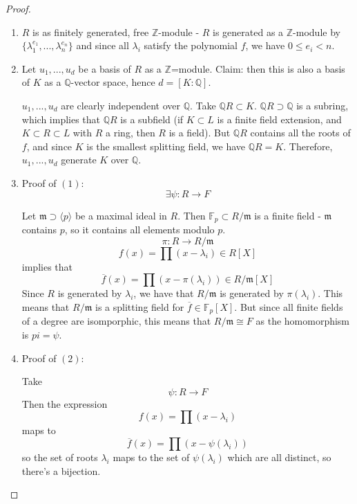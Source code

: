 \documentclass{article}
\theoremstyle{definition}
\theoremstyle{plain}%
\theoremstyle{remark}
\newcommand{\Q}{\mathbb{Q}}
\newcommand{\Z}{\mathbb{Z}}
\newcommand{\F}{\mathbb{F}}
\begin{document}
\begin{proof}
    \begin{enumerate}
        \item $R$ is as finitely generated, free $\Z$-module - $R$ is generated as a $\Z$-module by $\{\lambda_1^{e_1}, ..., \lambda_n^{e_n}\}$ and since all $\lambda_i$ satisfy the polynomial $f$, we have $0 \le e_i < n$.
        \item Let $u_1, ..., u_d$ be a basis of $R$ as a $\Z$=module. Claim: then this is also a basis of $K$ as a $\Q$-vector space, hence $d = [K : \Q]$.
        
        $u_1, ..., u_d$ are clearly independent over $\Q$. Take $\Q R \subset K$. $\Q R \supset \Q$ is a subring, which implies that $\Q R$ is a subfield (if $K \subset L$ is a finite field extension, and $K \subset R \subset L$ with $R$ a ring, then $R$ is a field). But $\Q R$ contains all the roots of $f$, and since $K$ is the smallest splitting field, we have $\Q R = K$. Therefore, $u_1, ..., u_d$ generate $K$ over $\Q$.
        \item Proof of $(1)$:
        \[\exists \psi : R \to F\]
        
        Let $\mathfrak{m} \supset \langle p \rangle$ be a maximal ideal in $R$. Then $\F_p \subset R / \mathfrak{m}$ is a finite field - $\mathfrak{m}$ contains $p$, so it contains all elements modulo $p$.
        \[\pi : R \to R / \mathfrak{m}\]
        \[f(x) =  \prod(x-\lambda_i) \in R[X]\]
        implies that
        \[\overline{f}(x) = \prod(x - \pi(\lambda_i)) \in R / \mathfrak{m}[X]\]
        Since $R$ is generated by $\lambda_i$, we have that $R / \mathfrak{m}$ is generated by $\pi(\lambda_i)$. This means that $R / \mathfrak{m}$ is a splitting field for $\overline{f} \in \F_p[X]$. But since all finite fields of a degree are isomporphic, this means that $R / \mathfrak{m} \cong F$ as the homomorphism is $pi = \psi$.
        \item Proof of $(2)$:
        
        Take
        \[\psi : R \to F\]
        Then the expression
        \[f(x) = \prod (x-\lambda_i)\]
        maps to
        \[\overline{f}(x) = \prod (x - \psi(\lambda_i))\]
        so the set of roots $\lambda_i$ maps to the set of $\psi(\lambda_i)$ which are all distinct, so there's a bijection.
    \end{enumerate}
\end{proof}
\end{document}
